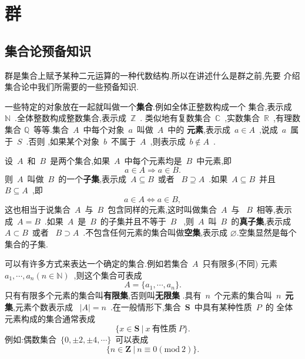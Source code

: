 \chapter{群}\label{chap:1}
\section{集合论预备知识}\label{sec:1.1}
群是集合上赋予某种二元运算的一种代数结构.所以在讲述什么是群之前,先要
介绍集合论中我们所需要的一些预备知识.\par
一些特定的对象放在一起就叫做一个\textbf{集合}.例如全体正整数构成一个
集合,表示成~$\mathbb{N}$~.全体整数构成整数集合,表示成~$\mathbb{Z}$~.
类似地有复数集合~$\mathbb{C}$~,实数集合~$\mathbb{R}$~,有理数集合
$\mathbb{Q}$~等等.集合~$A$~中每个对象~$a$~叫做~$A$~中的
\textbf{元素},表示成~$a\in A$~,说成~$a$~属于~$S$~.否则
,如果某个对象~$b$~不属于~$A$~,则表示成~$b\notin A$~.
\par
设~$A$~和~$B$~是两个集合,如果~$A$~中每个元素均是~$B$~中元素,即
\begin{equation*}
    a \in A \Rightarrow a \in B.
\end{equation*}
则~$A$~叫做~$B$~的一个\textbf{子集},表示成~$A\subseteq B$~或者
~$B\supseteq A$~.如果~$A\subseteq B$~并且~$B\subseteq A$~,即
\begin{equation*}
    a \in A \Leftrightarrow a \in B,
\end{equation*}
这也相当于说集合~$A$~与~$B$~包含同样的元素,这时叫做集合~$A$~与
~$B$~相等,表示成~$A=B$~.如果~$A$~是~$B$~的子集并且不等于~$B$~
,则~$A$~叫~$B$~的\textbf{真子集},表示成~$A \subset B$~或者
~$B \supset A$~.不包含任何元素的集合叫做\textbf{空集},表示成
$\varnothing$.空集显然是每个集合的子集.\par
可以有许多方式来表达一个确定的集合.例如若集合~$A$~只有限多(不同)
元素~$a_1,\cdots,a_n(n \in \mathbb{N})$~,则这个集合可表成
\begin{equation*}
    A=\{a_1,\cdots,a_n\}.
\end{equation*}
只有有限多个元素的集合叫\textbf{有限集},否则叫\textbf{无限集}
.具有~$n$~个元素的集合叫~$n$~\textbf{元集},元素个数表示成
~$|A|=n$~.在一般情形下,集合~$\bm{S}$~中具有某种性质~$P$~的
全体元素构成的集合通常表成
\begin{equation*}
    \{x \in \bm{S}~|~x~\mbox{有性质}~P\}.
\end{equation*}
例如:偶数集合~$\{0,\pm2,\pm4,\cdots\}$~可以表成
\begin{equation*}
    \{n \in \bm{Z}~|~n \equiv 0(\mathrm{mod}~2)\}.
\end{equation*}\par

